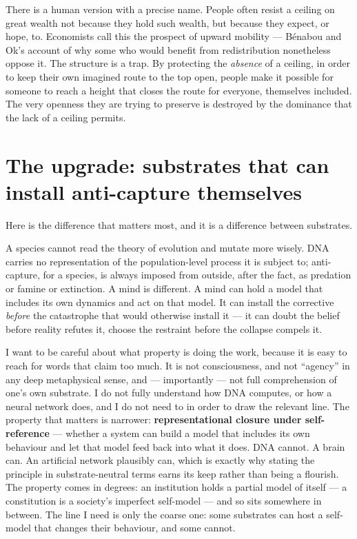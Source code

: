 \documentclass[11pt, a4paper]{report}
\begin{document}
There is a human version with a precise name. People often resist a ceiling on great wealth not because they hold such wealth, but because they expect, or hope, to. Economists call this the prospect of upward mobility --- Bénabou and Ok's account of why some who would benefit from redistribution nonetheless oppose it. The structure is a trap. By protecting the \textit{absence} of a ceiling, in order to keep their own imagined route to the top open, people make it possible for someone to reach a height that closes the route for everyone, themselves included. The very openness they are trying to preserve is destroyed by the dominance that the lack of a ceiling permits.

\section{The upgrade: substrates that can install anti-capture themselves}

Here is the difference that matters most, and it is a difference between substrates.

A species cannot read the theory of evolution and mutate more wisely. DNA carries no representation of the population-level process it is subject to; anti-capture, for a species, is always imposed from outside, after the fact, as predation or famine or extinction. A mind is different. A mind can hold a model that includes its own dynamics and act on that model. It can install the corrective \textit{before} the catastrophe that would otherwise install it --- it can doubt the belief before reality refutes it, choose the restraint before the collapse compels it.

I want to be careful about what property is doing the work, because it is easy to reach for words that claim too much. It is not consciousness, and not ``agency'' in any deep metaphysical sense, and --- importantly --- not full comprehension of one's own substrate. I do not fully understand how DNA computes, or how a neural network does, and I do not need to in order to draw the relevant line. The property that matters is narrower: \textbf{representational closure under self-reference} --- whether a system can build a model that includes its own behaviour and let that model feed back into what it does. DNA cannot. A brain can. An artificial network plausibly can, which is exactly why stating the principle in substrate-neutral terms earns its keep rather than being a flourish. The property comes in degrees: an institution holds a partial model of itself --- a constitution is a society's imperfect self-model --- and so sits somewhere in between. The line I need is only the coarse one: some substrates can host a self-model that changes their behaviour, and some cannot.
\end{document}
